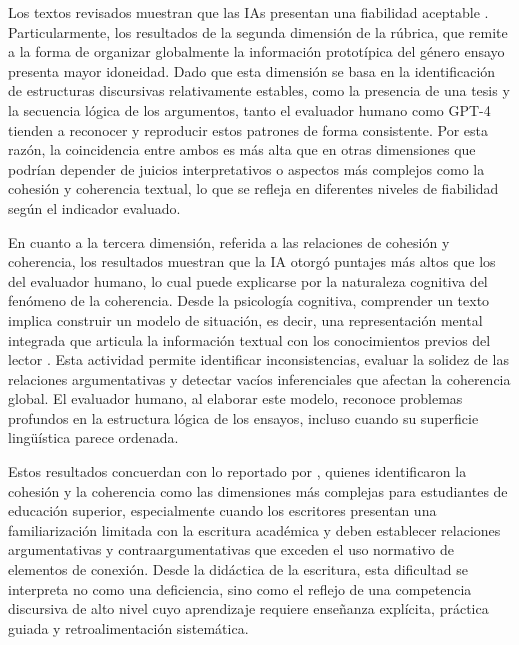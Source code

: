 \documentclass[spanish]{textolivre}
\begin{document}
Los textos revisados muestran que las IAs presentan una fiabilidad aceptable \cite{ossa2023}. Particularmente, los resultados de la segunda dimensión de la rúbrica, que remite a la forma de organizar globalmente la información prototípica del género ensayo \cite{kloss2024} presenta mayor idoneidad. Dado que esta dimensión se basa en la identificación de estructuras discursivas relativamente estables, como la presencia de una tesis y la secuencia lógica de los argumentos, tanto el evaluador humano como GPT-4 tienden a reconocer y reproducir estos patrones de forma consistente. Por esta razón, la coincidencia entre ambos es más alta que en otras dimensiones que podrían depender de juicios interpretativos o aspectos más complejos como la cohesión y coherencia textual, lo que se refleja en diferentes niveles de fiabilidad según el indicador evaluado.

En cuanto a la tercera dimensión, referida a las relaciones de cohesión y coherencia, los resultados muestran que la IA otorgó puntajes más altos que los del evaluador humano, lo cual puede explicarse por la naturaleza cognitiva del fenómeno de la coherencia. Desde la psicología cognitiva, comprender un texto implica construir un modelo de situación, es decir, una representación mental integrada que articula la información textual con los conocimientos previos del lector \cite{kintsch1988}. Esta actividad permite identificar inconsistencias, evaluar la solidez de las relaciones argumentativas y detectar vacíos inferenciales que afectan la coherencia global. El evaluador humano, al elaborar este modelo, reconoce problemas profundos en la estructura lógica de los ensayos, incluso cuando su superficie lingüística parece ordenada.

Estos resultados concuerdan con lo reportado por \textcite{kloss-tapia2025}, quienes identificaron la cohesión y la coherencia como las dimensiones más complejas para estudiantes de educación superior, especialmente cuando los escritores presentan una familiarización limitada con la escritura académica y deben establecer relaciones argumentativas y contraargumentativas que exceden el uso normativo de elementos de conexión. Desde la didáctica de la escritura, esta dificultad se interpreta no como una deficiencia, sino como el reflejo de una competencia discursiva de alto nivel cuyo aprendizaje requiere enseñanza explícita, práctica guiada y retroalimentación sistemática.
\end{document}
